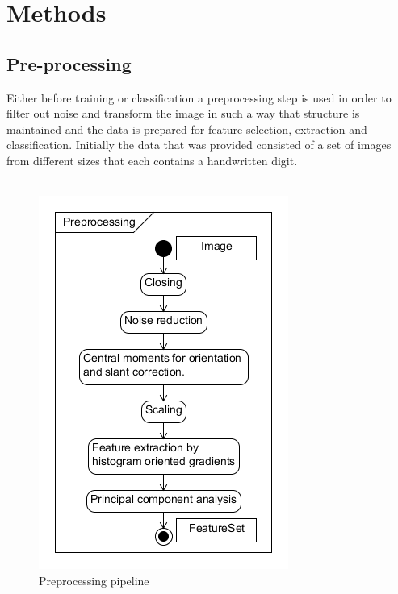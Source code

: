 \documentclass[%
        compressed,
        final,
        notitlepage,
        narroweqnarray,
        inline,
        twoside,
        ]{ieee}
\begin{document}
\section{Methods}
\subsection{Pre-processing}
Either before training or classification a preprocessing step is used in order
to filter out noise and transform the image in such a way that structure is
maintained and the data is prepared for feature selection, extraction and
classification. Initially the data that was provided consisted of a set of
images from different sizes that each contains a handwritten digit.\\\\
\begin{figure}[h!]
    \centering
    \includegraphics[width=\columnwidth]{preprocessing2.png}
    \caption{Preprocessing pipeline}
    \label{fig:preprocessing}
\end{figure}
\end{document}
